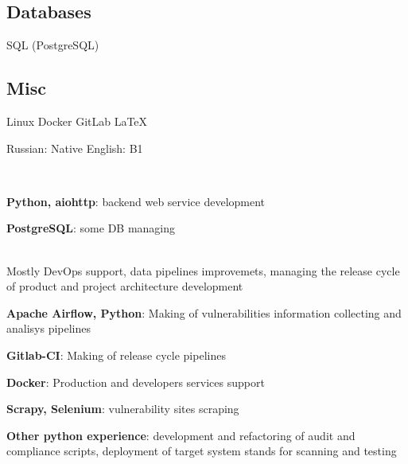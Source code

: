 \documentclass[a4paper]{MagicalCV}
\begin{document}
\begin{minipage}[t]{0.33\textwidth}
\subsection{Databases}
SQL (PostgreSQL)
\subsection{Misc}
Linux \textbullet{} 
Docker \textbullet{} 
GitLab \textbullet{}
\LaTeX
\sectionsep


Russian: Native \textbullet{} 
English: B1
\sectionsep

\end{minipage} 
\hfill
\begin{minipage}[t]{0.66\textwidth} 


 \\
\vspace{\topsep} %
\begin{tightemize}
  \item \textbf{Python, aiohttp}: backend web service development
  \item \textbf{PostgreSQL}: some DB managing
\end{tightemize}
\sectionsep

 \\
\vspace{\topsep} %
Mostly DevOps support, data pipelines improvemets, 
managing the release cycle of product and project architecture development
\begin{tightemize}
  \item \textbf{Apache Airflow, Python}: Making of vulnerabilities information collecting and analisys pipelines
  \item \textbf{Gitlab-CI}: Making of release cycle pipelines
  \item \textbf{Docker}: Production and developers services support
  \item \textbf{Scrapy, Selenium}: vulnerability sites scraping
  \item \textbf{Other python experience}: development and refactoring of audit and compliance scripts, 
  deployment of target system stands for scanning and testing
\end{tightemize}
\sectionsep


\end{minipage}
\end{document}
